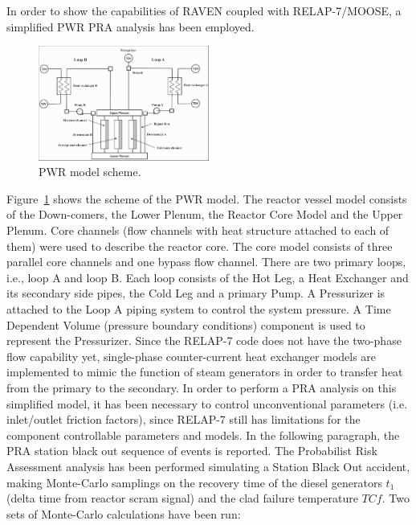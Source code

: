 \documentclass{mc2013}
\begin{document}
In order to show the capabilities of RAVEN coupled with RELAP-7/MOOSE, a simplified PWR PRA analysis has been employed.
\begin{figure}
   \centering
    \includegraphics[width=0.5\textwidth]{figures/PWR_TMI_SCHEME.PNG}
    \caption{PWR model scheme.}
    \label{fig:PWRmodel}
\end{figure}
Figure~\ref{fig:PWRmodel} shows the scheme of the PWR model. The reactor vessel model consists of the Down-comers, the Lower Plenum, the Reactor Core Model and the Upper Plenum. Core channels (flow channels with heat structure attached to each of them) were used to describe the reactor core. The core model consists of three parallel core channels and one bypass flow channel. 
There are two primary loops, i.e., loop A and loop B. Each loop consists of the Hot Leg, a Heat Exchanger and its secondary side pipes, the Cold Leg and a primary Pump. A Pressurizer is attached to the Loop A piping system to control the system pressure. A Time Dependent Volume (pressure boundary conditions) component is used to represent the Pressurizer. Since the RELAP-7 code does not have the two-phase flow capability yet, single-phase counter-current heat exchanger models are implemented to mimic the function of steam generators in order to transfer heat from the primary to the secondary.
In order to perform a PRA analysis on this simplified model, it has been necessary to control unconventional parameters (i.e. inlet/outlet friction factors), since RELAP-7 still has limitations for the component controllable parameters and models. In the following paragraph, the PRA station black out sequence of events is reported. 
The Probabilist Risk Assessment analysis has been performed simulating a Station Black Out accident, making Monte-Carlo samplings on the recovery time of the diesel generators  $t_{1}$ (delta time from reactor scram signal) and the clad failure temperature $TC{f}$. Two sets of Monte-Carlo calculations have been run:
\end{document}
